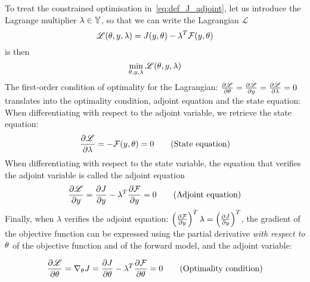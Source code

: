 \documentclass[../../Main_ManuscritThese.tex]{subfiles}
\begin{document}
To treat the constrained optimisation in~\cref{eq:def_J_adjoint}, let us introduce the Lagrange multiplier $\lambda \in \mathbb{Y}$, so that we can write the Lagrangian $\mathscr{L}$
\begin{equation}
  \mathscr{L}(\theta, y, \lambda) = J(y,\theta) - \lambda^T \mathcal{F}(y, \theta)
\end{equation}
 is then
\begin{equation}
  \min_{\theta,y,\lambda} \mathscr{L}(\theta,y,\lambda)
\end{equation}
The first-order condition of optimality for the Lagrangian:
$\frac{\partial \mathscr{L}}{\partial \theta} = \frac{\partial \mathscr{L}}{\partial y} =
\frac{\partial \mathscr{L}}{\partial \lambda} = 0$ translates into the optimality
condition, adjoint equation and the state equation: When
differentiating with respect to the adjoint variable, we retrieve the
state equation:
\begin{equation}
  \frac{\partial \mathscr{L}}{\partial \lambda} = - \mathcal{F}(y,\theta) = 0 \tag{State equation}
\end{equation}
When differentiating with respect to the state variable, the equation that verifies the adjoint variable is called the adjoint equation
\begin{equation}
  \frac{\partial \mathscr{L}}{\partial y} = \frac{\partial J}{\partial y} - \lambda^T \frac{\partial \mathcal{F}}{\partial y}= 0  \tag{Adjoint equation}
\end{equation}
Finally, when $\lambda$ verifies the adjoint equation: $ \left(\frac{\partial \mathcal{F}}{\partial y}\right)^T\lambda= \left(\frac{\partial J}{\partial y}\right)^T$, the gradient of the objective function can be expressed using the partial derivative \emph{with respect to $\theta$} of the objective function and of the forward model, and the adjoint variable:

\begin{equation}
    \pfrac{\mathscr{L}}{\kk} = \nabla_\kk J %
                               = \pfrac{J}{\kk} - \innerprod{\lambda}{\pfrac{\mathcal{F}}{\kk}} = 0 \tag{Optimality condition}
\end{equation}
\end{document}
